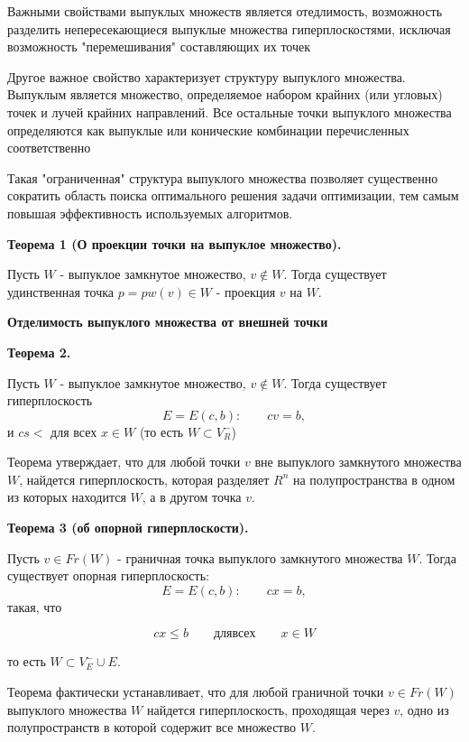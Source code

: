 \documentclass[14pt, letterpaper]{article}
\begin{document}
Важными свойствами выпуклых множеств является отедлимость, возможность разделить непересекающиеся выпуклые множества гиперплоскостями, исключая возможность "перемешивания" составляющих их точек

Другое важное свойство характеризует структуру выпуклого множества. Выпуклым является множество, определяемое набором крайних (или угловых) точек и лучей крайних направлений. Все остальные точки выпуклого множества определяются как выпуклые или конические комбинации перечисленных соответственно

Такая "ограниченная" структура выпуклого множества позволяет существенно сократить область поиска оптимального решения задачи оптимизации, тем самым повышая эффективность используемых алгоритмов.

\textbf{Теорема 1 (О проекции точки на выпуклое множество).}

Пусть $W$ - выпуклое замкнутое множество, $v \notin W$. Тогда существует удинственная точка $p = pw(v) \in W$ - проекция $v$ на $W$.

\textbf{Отделимость выпуклого множества от внешней точки}


\textbf{Теорема 2.}

Пусть $W$ - выпуклое замкнутое множество, $v \notin W$. Тогда существует гиперплоскость
    $$ E = E(c, b): \qquad  cv = b,$$
и $cs \lt$ для всех $x \in W$ (то есть $W \subset V^{-}_{R}$)

Теорема утверждает, что для любой точки $v$ вне выпуклого замкнутого множества $W$, найдется гиперплоскость, которая разделяет $R^{n}$ на полупространства в одном из которых находится $W$, а в другом точка $v$.

\textbf{Теорема 3 (об опорной гиперплоскости).}

Пусть $v \in Fr(W)$ - граничная точка выпуклого замкнутого множества $W$. Тогда существует опорная гиперплоскость:
$$E = E(c, b): \qquad cx = b,$$
такая, что

$$cx \leq b \qquad для всех \qquad x \in W$$

то есть $W \subset V^{-}_{E} \cup E.$

Теорема фактически устанавливает, что для любой граничной точки $v \in Fr(W)$ выпуклого множества $W$ найдется гиперплоскость, проходящая через $v$, одно из полупространств в которой содержит все множество $W$.
\end{document}
